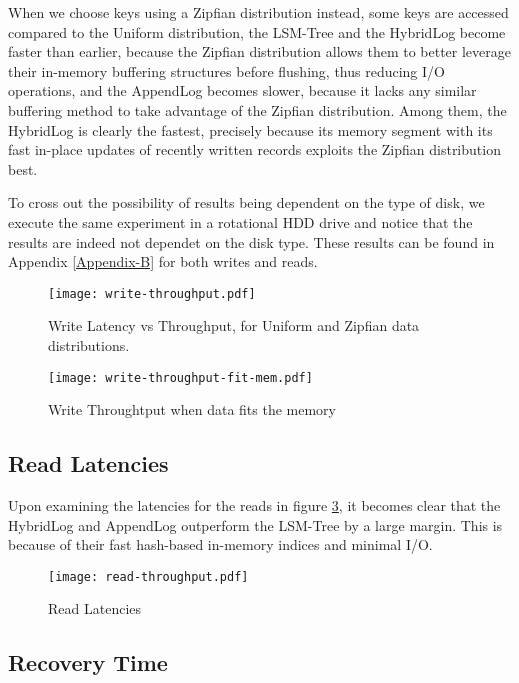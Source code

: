 When we choose keys using a Zipfian distribution instead, some keys are accessed compared to the Uniform distribution, the LSM-Tree and the HybridLog become faster than earlier, because the Zipfian distribution allows them to better leverage their in-memory buffering structures before flushing, thus reducing I/O operations, and the AppendLog becomes slower, because it lacks any similar buffering method to take advantage of the Zipfian distribution. Among them, the HybridLog is clearly the fastest, precisely because its memory segment with its fast in-place updates of recently written records exploits the Zipfian distribution best.

To cross out the possibility of results being dependent on the type of disk, we execute the same experiment in a rotational HDD drive and notice that the results are indeed not dependet on the disk type. These results can be found in Appendix \ref{Appendix-B} for both writes and reads.

\begin{figure}[h]
    \centering
    \texttt{[image: write-throughput.pdf]}
    \caption{Write Latency vs Throughput, for Uniform and Zipfian data distributions.}
    \label{fig:comparison-write}
\end{figure}

\begin{figure}[h]
    \centering
    \texttt{[image: write-throughput-fit-mem.pdf]}
    \caption{Write Throughtput when data fits the memory}
    \label{fig:comparison-write-fit-mem}
\end{figure}

\subsection{Read Latencies}

Upon examining the latencies for the reads in figure \ref{fig:comparison-read-latencies}, it becomes clear that the HybridLog and AppendLog outperform the LSM-Tree by a large margin. This is because of their fast hash-based in-memory indices and minimal I/O.

\begin{figure}[h]
    \centering
    \texttt{[image: read-throughput.pdf]}
    \caption{Read Latencies}
    \label{fig:comparison-read-latencies}
\end{figure}

\subsection{Recovery Time}

